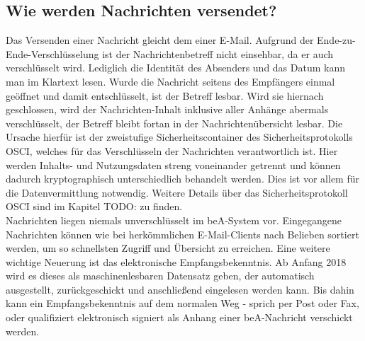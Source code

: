 \subsection{Wie werden Nachrichten versendet?}
Das Versenden einer Nachricht gleicht dem einer E-Mail. Aufgrund der Ende-zu-Ende-Verschlüsselung ist der Nachrichtenbetreff nicht einsehbar, da er auch verschlüsselt wird. Lediglich die Identität des Absenders und das Datum kann man im Klartext lesen. Wurde die Nachricht seitens des Empfängers einmal geöffnet und damit entschlüsselt, ist der Betreff lesbar. Wird sie hiernach geschlossen, wird der Nachrichten-Inhalt inklusive aller Anhänge abermals verschlüsselt, der Betreff bleibt fortan in der Nachrichtenübersicht lesbar. Die Ursache hierfür ist der zweistufige Sicherheitscontainer des Sicherheitsprotokolls OSCI, welches für das Verschlüsseln der Nachrichten verantwortlich ist. Hier werden Inhalts- und Nutzungsdaten streng voneinander getrennt und können dadurch kryptographisch unterschiedlich behandelt werden. Dies ist vor allem für die Datenvermittlung notwendig.\textcite{bea:osci}  Weitere Details über das Sicherheitsprotokoll OSCI sind im Kapitel TODO: zu finden. \\
Nachrichten liegen niemals unverschlüsselt im beA-System vor. Eingegangene Nachrichten können wie bei herkömmlichen E-Mail-Clients nach Belieben sortiert werden, um so schnellsten Zugriff und Übersicht zu erreichen.
Eine weitere wichtige Neuerung ist das elektronische Empfangsbekenntnis. Ab Anfang 2018 wird es dieses als maschinenlesbaren Datensatz geben, der automatisch ausgestellt, zurückgeschickt und anschließend eingelesen werden kann. Bis dahin kann ein Empfangsbekenntnis auf dem normalen Weg - sprich per Post oder Fax, oder qualifiziert elektronisch signiert als Anhang einer beA-Nachricht verschickt werden. 

